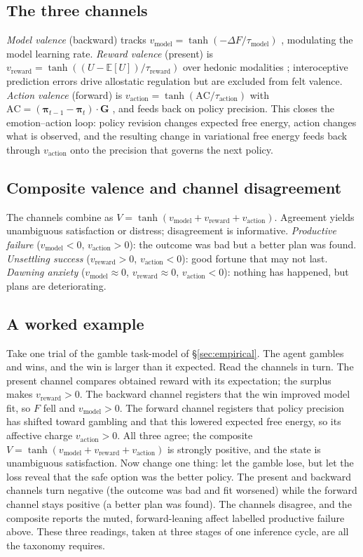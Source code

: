 \documentclass[11pt,a4paper]{article}
\begin{document}
\subsection{The three channels}
\emph{Model valence} (backward) tracks $v_{\text{model}}=\tanh(-\Delta F/\tau_{\text{model}})$
\citep{joffily2013emotional}, modulating the model learning rate. \emph{Reward
valence} (present) is $v_{\text{reward}}=\tanh((U-\mathbb{E}[U])/\tau_{\text{reward}})$
over hedonic modalities \citep{pattisapu2024free}; interoceptive prediction errors
drive allostatic regulation but are excluded from felt valence. \emph{Action valence}
(forward) is $v_{\text{action}}=\tanh(\text{AC}/\tau_{\text{action}})$ with
$\text{AC}=(\boldsymbol\pi_{t-1}-\boldsymbol\pi_t)\cdot\mathbf G$
\citep{hesp2021deeply}, and feeds back on policy precision. This closes the
emotion--action loop: policy revision changes expected free energy, action changes
what is observed, and the resulting change in variational free energy feeds back
through $v_{\text{action}}$ onto the precision that governs the next policy.

\subsection{Composite valence and channel disagreement}
The channels combine as $V=\tanh(v_{\text{model}}+v_{\text{reward}}+v_{\text{action}})$.
Agreement yields unambiguous satisfaction or distress; disagreement is
informative. \emph{Productive failure} ($v_{\text{model}}<0$,
$v_{\text{action}}>0$): the outcome was bad but a better plan was found. \emph{Unsettling
success} ($v_{\text{reward}}>0$, $v_{\text{action}}<0$): good fortune that may not
last. \emph{Dawning anxiety} ($v_{\text{model}}\!\approx\!0$, $v_{\text{reward}}\!\approx\!0$,
$v_{\text{action}}<0$): nothing has happened, but plans are deteriorating.

\subsection{A worked example}
Take one trial of the gamble task-model of \S\ref{sec:empirical}. The agent gambles
and wins, and the win is larger than it expected. Read the channels in turn. The
present channel compares obtained reward with its expectation; the surplus makes
$v_{\text{reward}}>0$. The backward channel registers that the win improved model fit,
so $F$ fell and $v_{\text{model}}>0$. The forward channel registers that policy
precision has shifted toward gambling and that this lowered expected free energy, so
its affective charge $v_{\text{action}}>0$. All three agree; the composite
$V=\tanh(v_{\text{model}}+v_{\text{reward}}+v_{\text{action}})$ is strongly positive,
and the state is unambiguous satisfaction. Now change one thing: let the gamble lose,
but let the loss reveal that the safe option was the better policy. The present and
backward channels turn negative (the outcome was bad and fit worsened) while the
forward channel stays positive (a better plan was found). The channels disagree, and
the composite reports the muted, forward-leaning affect labelled productive failure
above. These three readings, taken at three stages of one inference cycle, are all the
taxonomy requires.
\end{document}
